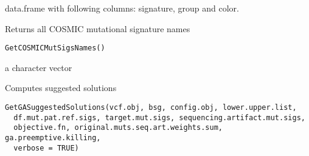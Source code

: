 \documentclass[letterpaper]{book}
\begin{document}
%
\begin{Value}
data.frame with following columns: signature, group and color.
\end{Value}
%
\begin{Description}\relax
Returns all COSMIC mutational signature names
\end{Description}
%
\begin{Usage}
\begin{verbatim}
GetCOSMICMutSigsNames()
\end{verbatim}
\end{Usage}
%
\begin{Value}
a character vector
\end{Value}
%
\begin{Description}\relax
Computes suggested solutions
\end{Description}
%
\begin{Usage}
\begin{verbatim}
GetGASuggestedSolutions(vcf.obj, bsg, config.obj, lower.upper.list,
  df.mut.pat.ref.sigs, target.mut.sigs, sequencing.artifact.mut.sigs,
  objective.fn, original.muts.seq.art.weights.sum, ga.preemptive.killing,
  verbose = TRUE)
\end{verbatim}
\end{Usage}
%
\end{document}

